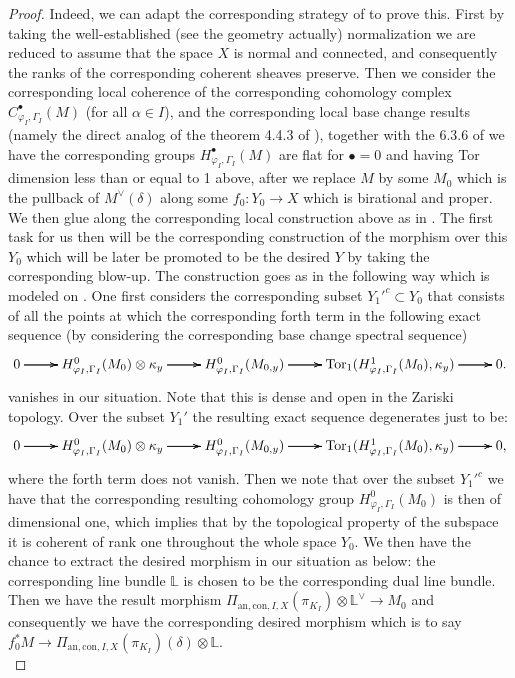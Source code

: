 \documentclass[12pt]{amsart}
\theoremstyle{definition}
\numberwithin{equation}{section}
\begin{document}
\begin{proof}


Indeed, we can adapt the corresponding strategy of \cite[Theorem 6.3.9]{KPX} to prove this. First by taking the well-established (see \cite[Theorem 6.3.9]{KPX} the geometry actually) normalization we are reduced to assume that the space $X$ is normal and connected, and consequently the ranks of the corresponding coherent sheaves preserve. Then we consider the corresponding local coherence of the corresponding cohomology complex $C^\bullet_{\varphi_I,\Gamma_I}(M)$ (for all $\alpha\in I$), and the corresponding local base change results (namely the direct analog of the theorem 4.4.3 of \cite{KPX}), together with the 6.3.6 of \cite{KPX} we have the corresponding groups $H^\bullet_{\varphi_I,\Gamma_I}(M)$ are flat for $\bullet=0$ and having Tor dimension less than or equal to 1 above, after we replace $M$ by some $M_0$ which is the pullback of $M^\vee(\delta)$ along some $f_0:Y_0\rightarrow X$ which is birational and proper. We then glue along the corresponding local construction above as in \cite[Theorem 6.3.9]{KPX}. The first task for us then will be the corresponding construction of the morphism over this $Y_0$ which will be later be promoted to be the desired $Y$ by taking the corresponding blow-up. The construction goes as in the following way which is modeled on \cite[Theorem 6.3.9]{KPX}. One first considers the corresponding subset $Y_1'^c\subset Y_0$ that consists of all the points at which the corresponding forth term in the following exact sequence (by considering the corresponding base change spectral sequence)
\[
\xymatrix@R+0pc@C+0pc{
0\ar[r] \ar[r] \ar[r]  &H^0_{\varphi_I,\Gamma_I}(M_0)\otimes\kappa_y \ar[r] \ar[r] \ar[r]  &H^0_{\varphi_I,\Gamma_I}(M_{0,y}) \ar[r] \ar[r] \ar[r] &\mathrm{Tor}_1(H^1_{\varphi_I,\Gamma_I}(M_0),\kappa_y) \ar[r] \ar[r] \ar[r] &0
.}
\]
vanishes in our situation. Note that this is dense and open in the Zariski topology. Over the subset $Y_1'$ the resulting exact sequence degenerates just to be:
\[
\xymatrix@R+0pc@C+0pc{
0\ar[r] \ar[r] \ar[r]  &H^0_{\varphi_I,\Gamma_I}(M_0)\otimes\kappa_y \ar[r] \ar[r] \ar[r]  &H^0_{\varphi_I,\Gamma_I}(M_{0,y}) \ar[r] \ar[r] \ar[r] &\mathrm{Tor}_1(H^1_{\varphi_I,\Gamma_I}(M_0),\kappa_y) \ar[r] \ar[r] \ar[r] &0
,}
\]
where the forth term does not vanish. Then we note that over the subset $Y_1'^c$ we have that the corresponding resulting cohomology group $H^0_{\varphi_I,\Gamma_I}(M_0)$ is then of dimensional one, which implies that by the topological property of the subspace it is coherent of rank one throughout the whole space $Y_0$. We then have the chance to extract the desired morphism in our situation as below: the corresponding line bundle $\mathbb{L}$ is chosen to be the corresponding dual line bundle. Then we have the result morphism $\Pi_{\mathrm{an},\mathrm{con},I,X}(\pi_{K_I})\otimes \mathbb{L}^\vee\rightarrow M_0$ and consequently we have the corresponding desired morphism which is to say $f_0^*M\rightarrow \Pi_{\mathrm{an},\mathrm{con},I,X}(\pi_{K_I})(\delta)\otimes \mathbb{L}$. \\

\end{proof}
\end{document}
